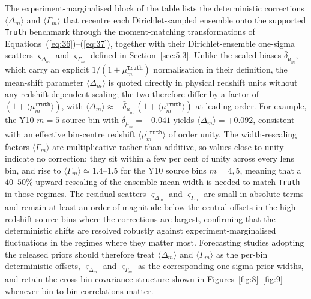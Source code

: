 The experiment-marginalised block of the table lists the deterministic corrections \(\langle\Delta_m\rangle\) and \(\langle\Gamma_m\rangle\) that recentre each Dirichlet-sampled ensemble onto the supported \texttt{Truth} benchmark through the moment-matching transformations of Equations~(\ref{eq:36})--(\ref{eq:37}), together with their Dirichlet-ensemble one-sigma scatters \(\varsigma_{\Delta_m}\) and \(\varsigma_{\Gamma_m}\) defined in Section~\ref{sec:5.3}. Unlike the scaled biases \(\bar{\delta}_{\mu_m}\), which carry an explicit \(1/(1+\mu_m^{\texttt{Truth}})\) normalisation in their definition, the mean-shift parameter \(\langle\Delta_m\rangle\) is quoted directly in physical redshift units without any redshift-dependent scaling; the two therefore differ by a factor of \((1+\langle\mu_m^{\texttt{Truth}}\rangle)\), with \(\langle\Delta_m\rangle \approx -\bar{\delta}_{\mu_m}\,(1+\langle\mu_m^{\texttt{Truth}}\rangle)\) at leading order. For example, the Y10 \(m=5\) source bin with \(\bar{\delta}_{\mu_m}=-0.041\) yields \(\langle\Delta_m\rangle=+0.092\), consistent with an effective bin-centre redshift \(\langle\mu_m^{\texttt{Truth}}\rangle\) of order unity. The width-rescaling factors \(\langle\Gamma_m\rangle\) are multiplicative rather than additive, so values close to unity indicate no correction: they sit within a few per cent of unity across every lens bin, and rise to \(\langle\Gamma_m\rangle\simeq 1.4\text{--}1.5\) for the Y10 source bins \(m=4,5\), meaning that a \(40\text{--}50\%\) upward rescaling of the ensemble-mean width is needed to match \texttt{Truth} in those regimes. The residual scatters \(\varsigma_{\Delta_m}\) and \(\varsigma_{\Gamma_m}\) are small in absolute terms and remain at least an order of magnitude below the central offsets in the high-redshift source bins where the corrections are largest, confirming that the deterministic shifts are resolved robustly against experiment-marginalised fluctuations in the regimes where they matter most. Forecasting studies adopting the released priors should therefore treat \(\langle\Delta_m\rangle\) and \(\langle\Gamma_m\rangle\) as the per-bin deterministic offsets, \(\varsigma_{\Delta_m}\) and \(\varsigma_{\Gamma_m}\) as the corresponding one-sigma prior widths, and retain the cross-bin covariance structure shown in Figures~\ref{fig:8}--\ref{fig:9} whenever bin-to-bin correlations matter.
